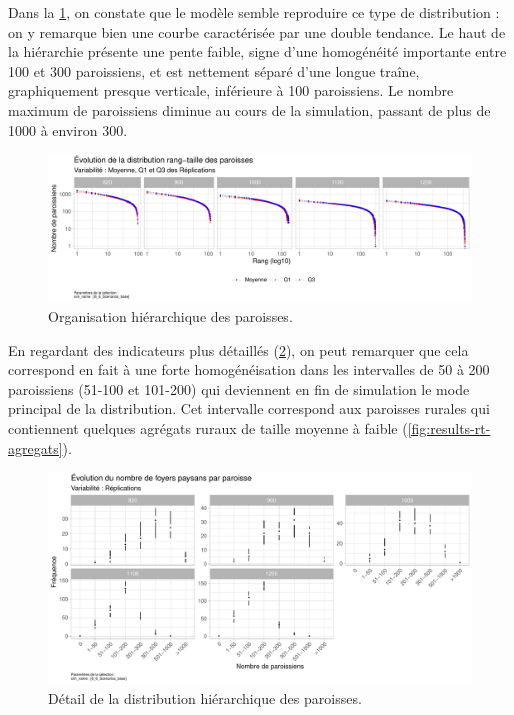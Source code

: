 Dans la \cref{fig:results-rt-paroisses}, on constate que le modèle semble reproduire ce type de distribution : on y remarque bien une courbe caractérisée par une double tendance.
Le haut de la hiérarchie présente une pente faible, signe d'une homogénéité importante entre 100 et 300 paroissiens, et est nettement séparé d'une longue traîne, graphiquement presque verticale, inférieure à 100 paroissiens.
Le nombre maximum de paroissiens diminue au cours de la simulation, passant de plus de 1000 à environ 300.

\begin{figure}[H]
	\centering
	\includegraphics[width=\linewidth]{img/results_6_6/Paroisses_RT_Haut.pdf}
	\caption{Organisation hiérarchique des paroisses.}
	\label{fig:results-rt-paroisses}
\end{figure}

En regardant des indicateurs plus détaillés (\cref{fig:results-paroisses-hierarchie}), on peut remarquer que cela correspond en fait à une forte homogénéisation dans les intervalles de 50 à 200 paroissiens (51-100 et 101-200) qui deviennent en fin de simulation le mode principal de la distribution.
Cet intervalle correspond aux paroisses rurales qui contiennent quelques agrégats ruraux de taille moyenne à faible (\cref{fig:results-rt-agregats}).

\begin{figure}[H]
	\centering
	\includegraphics[width=\linewidth]{img/results_6_6/Paroisses_Compo_Haut.pdf}
	\caption{Détail de la distribution hiérarchique des paroisses.}
	\label{fig:results-paroisses-hierarchie}
\end{figure}

